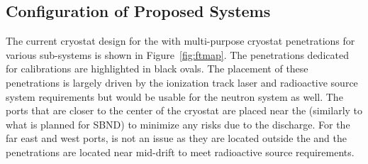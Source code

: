 

\subsection{Configuration of Proposed Systems} %
\label{sec:FTs}

The current cryostat design for the 
\spmod with multi-purpose cryostat penetrations for various sub-systems is shown in Figure~\ref{fig:ftmap}. The penetrations dedicated for calibrations are highlighted in black ovals. The placement of these penetrations is largely driven by the ionization track laser and radioactive source system requirements but would be usable for the neutron system as well.  The ports that are closer to the center of the cryostat are placed near the  (similarly to what is planned for SBND) to minimize any risks due to the  discharge. For the far east and west ports,  is not an issue as they are located outside the  and the penetrations are located near mid-drift to meet radioactive source requirements. 

